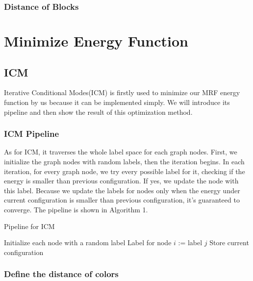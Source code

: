 \documentclass{article} %
\begin{document}
		\subsubsection{Distance of Blocks}
\section{Minimize Energy Function}
	\subsection{ICM}
	Iterative Conditional Modes(ICM)\cite{besag1986} is firstly used to minimize our MRF energy function by us because it can be implemented simply. We will introduce its pipeline and then show the result of this optimization method.
		\subsubsection{ICM Pipeline}
        
			As for ICM, it traverses the whole label space for each graph nodes. First, we initialize the graph nodes with random labels, then the iteration begins. In each iteration, for every graph node, we try every possible label for it, checking if the energy is smaller than previous configuration. If yes, we update the node with this label. Because we update the labels for nodes only when the energy under current configuration is smaller than previous configuration, it's guaranteed to converge. The pipeline is shown in Algorithm 1.
			\begin{algorithm}
			\caption{Pipeline for ICM}
			\begin{algorithmic}
			\State Initialize each node with a random label
							\State Label for node $i$ := label $j$
						\EndIf
					\EndFor
				\EndFor
				\State Store current configuration
			\EndWhile
			\end{algorithmic}
			\end{algorithm}
        \subsubsection{Define the distance of colors}
        
\end{document}
